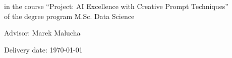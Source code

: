 \documentclass[%
pdftex,
oneside,			%
11pt,				%
parskip=half,		%
headheight = 12pt,	%
headsepline,		%
footsepline,		%
footheight = 16pt,	%
abstracton,		%
DIV=calc,		%
BCOR=8mm,		%
headinclude=false,	%
footinclude=false,	%
listof=totoc,		%
toc=bibliography,	%
]{scrreprt}	%
\def \abschluss {M.Sc.}
\def \studiengang {Data Science}
\def \datumAbgabe {\today}
\def \modul {Project: AI Excellence with Creative Prompt Techniques}
\def \tutor {Marek Malucha}
\begin{document}
\begin{titlepage}
        \begin{large} 
        \begin{center}
        in the course \enquote{\modul} \\
        of the degree program \abschluss { }\studiengang
        \end{center}
        \end{large} 
        
        \vspace*{10mm}
        
        \begin{large} 
        \begin{center}
        Advisor: \tutor 
        \end{center}
        \end{large}         
        \vspace*{-6mm}
        
        \begin{large} 
        \begin{center}
        Delivery date: \datumAbgabe
        \end{center}
        \end{large} 
\end{titlepage}
\end{document}
